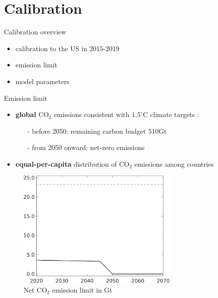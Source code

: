 \documentclass[11pt,aspectratio=169]{beamer}
\begin{document}
\hypertarget{calback}{}
\section{Calibration}
\begin{frame}{Calibration overview}
\begin{itemize}
	\item
	calibration to the US in 2015-2019
	\item emission limit
	\item model parameters
\end{itemize}
\end{frame}

\begin{frame}{Emission limit}
\vspace{-1mm}
\begin{itemize}
	\item<+->  \textbf{global} CO$_2$ emissions consistent with $1.5^\circ$C climate targets \footnotesize{\citep{IPCC2022}}:
	\vspace{1mm}
	\begin{itemize}
		\item[-] before 2050: remaining carbon budget 510Gt
		\item[-] from 2050 onward: net-zero  emissions
	\end{itemize}
	\vspace{0mm}
	\item<+-> \textbf{equal-per-capita} distribution of  CO$_2$ emissions among countries %
\end{itemize}
\vspace{-2mm}
\pause
\begin{center}
	\begin{minipage}{0.6\textwidth}
		\begin{figure}
			\caption{Net CO$_2$ emission limit in Gt}
			\includegraphics[width=0.7\textwidth]{../codding_model/own_basedOnFried/optimalPol_010922_revision/figures/all_13Sept22_Tplus30/Emnet_goals_o0_lgd0.png}

\end{figure}
\end{minipage}
\end{center}
\end{frame}
\end{document}
